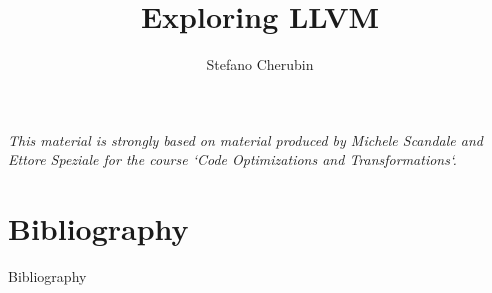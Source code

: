 \documentclass[10pt,mathserif]{beamer}
\author{Stefano Cherubin}
\institute{Politecnico di Milano}
\date{\DATE}
\title{Exploring LLVM}
\begin{document}
\begin{frame}
\maketitle
\begin{center}
\itshape\scriptsize This material is strongly based on material produced by
                    Michele Scandale and Ettore Speziale for the course
                    `Code Optimizations and Transformations`.
\end{center}
\end{frame}







\section{Bibliography}
\begin{frame}[allowframebreaks]{Bibliography}
\nocite{*}


\end{frame}
\end{document}
